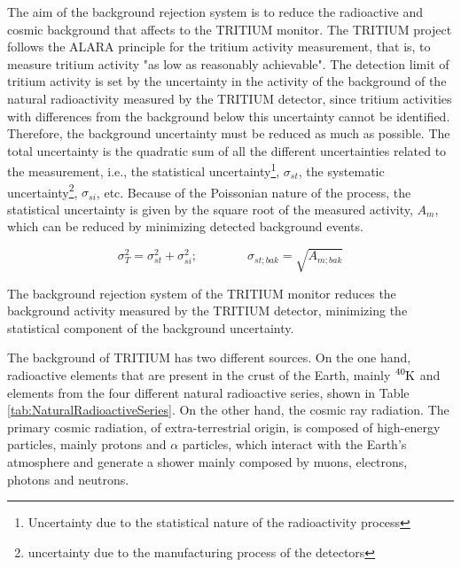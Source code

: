 The aim of the background rejection system is to reduce the radioactive and cosmic background that affects to the TRITIUM monitor. The TRITIUM project follows the ALARA principle for the tritium activity measurement, that is, to measure tritium activity "as low as reasonably achievable". The detection limit of tritium activity is set by the uncertainty in the activity of the background of the natural radioactivity measured by the TRITIUM detector, since tritium activities with differences from the background below this uncertainty cannot be identified. Therefore, the background uncertainty must be reduced as much as possible. The total uncertainty is the quadratic sum of all the different uncertainties related to the measurement, i.e., the statistical uncertainty\footnote{Uncertainty due to the statistical nature of the radioactivity process}, $\sigma_{st}$, the systematic uncertainty\footnote{uncertainty due to the manufacturing process of the detectors}, $\sigma_{si}$, etc. Because of the Poissonian nature of the process, the statistical uncertainty is given by the square root of the measured activity, $A_{m}$, which can be reduced by minimizing detected background events.

\begin{equation}
\sigma_{T}^2 = \sigma_{st}^2 +\sigma_{si}^2; \qquad \qquad \sigma_{st;bak} = \sqrt{A_{m;bak}}
\label{eq:SquareSumUncerainty}
\end{equation} 

The background rejection system of the TRITIUM monitor reduces the background activity measured by the TRITIUM detector, minimizing the statistical component of the background uncertainty.

The background of TRITIUM has two different sources. On the one hand, radioactive elements that are present in the crust of the Earth, mainly $\ce{^{40}K}$ and elements from the four different natural radioactive series, shown in Table \ref{tab:NaturalRadioactiveSeries}. On the other hand, the cosmic ray radiation. The primary cosmic radiation, of extra-terrestrial origin, is composed of high-energy particles, mainly protons and $\alpha$ particles, which interact with the Earth's atmosphere and generate a shower mainly composed by muons, electrons, photons and neutrons.

